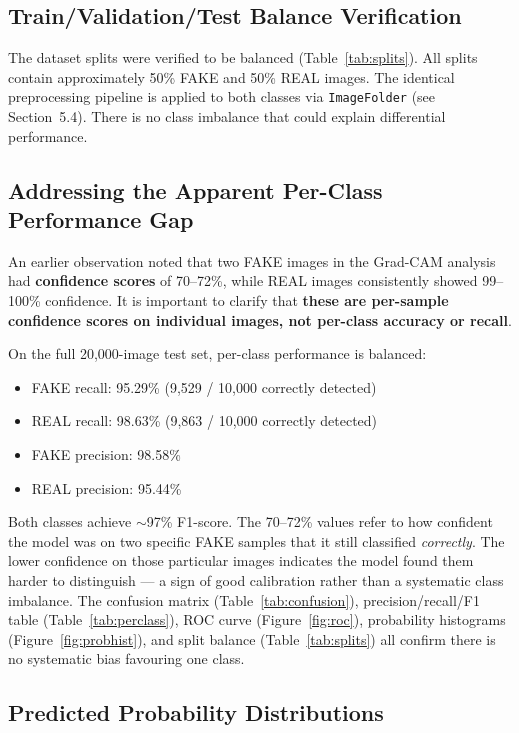 \documentclass[12pt,a4paper]{article}
\begin{document}
\subsection{Train/Validation/Test Balance Verification}
\label{sec:balance}

The dataset splits were verified to be balanced (Table~\ref{tab:splits}). All splits contain approximately 50\% FAKE and 50\% REAL images. The identical preprocessing pipeline is applied to both classes via \texttt{ImageFolder} (see Section~5.4). There is no class imbalance that could explain differential performance.

\subsection{Addressing the Apparent Per-Class Performance Gap}

An earlier observation noted that two FAKE images in the Grad-CAM analysis had \textbf{confidence scores} of 70--72\%, while REAL images consistently showed 99--100\% confidence. It is important to clarify that \textbf{these are per-sample confidence scores on individual images, not per-class accuracy or recall}.

On the full 20,000-image test set, per-class performance is balanced:
\begin{itemize}[noitemsep]
    \item FAKE recall: 95.29\% (9,529 / 10,000 correctly detected)
    \item REAL recall: 98.63\% (9,863 / 10,000 correctly detected)
    \item FAKE precision: 98.58\%
    \item REAL precision: 95.44\%
\end{itemize}

Both classes achieve ${\sim}$97\% F1-score. The 70--72\% values refer to how confident the model was on two specific FAKE samples that it still classified \emph{correctly}. The lower confidence on those particular images indicates the model found them harder to distinguish --- a sign of good calibration rather than a systematic class imbalance. The confusion matrix (Table~\ref{tab:confusion}), precision/recall/F1 table (Table~\ref{tab:perclass}), ROC curve (Figure~\ref{fig:roc}), probability histograms (Figure~\ref{fig:probhist}), and split balance (Table~\ref{tab:splits}) all confirm there is no systematic bias favouring one class.

\subsection{Predicted Probability Distributions}
\end{document}
